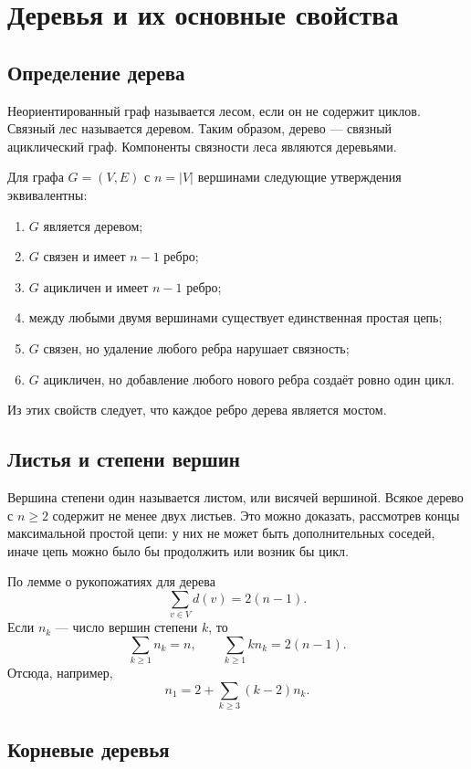 \section{Деревья и их основные свойства}
\label{sec:trees-properties}

\subsection{Определение дерева}

Неориентированный граф называется лесом, если он не содержит циклов. Связный
лес называется деревом. Таким образом, дерево --- связный ациклический граф.
Компоненты связности леса являются деревьями.

Для графа $G=(V,E)$ с $n=|V|$ вершинами следующие утверждения эквивалентны:
\begin{enumerate}
    \item $G$ является деревом;
    \item $G$ связен и имеет $n-1$ ребро;
    \item $G$ ацикличен и имеет $n-1$ ребро;
    \item между любыми двумя вершинами существует единственная простая цепь;
    \item $G$ связен, но удаление любого ребра нарушает связность;
    \item $G$ ацикличен, но добавление любого нового ребра создаёт ровно один цикл.
\end{enumerate}

Из этих свойств следует, что каждое ребро дерева является мостом.

\subsection{Листья и степени вершин}

Вершина степени один называется листом, или висячей вершиной. Всякое дерево с
$n\geq2$ содержит не менее двух листьев. Это можно доказать, рассмотрев концы
максимальной простой цепи: у них не может быть дополнительных соседей, иначе
цепь можно было бы продолжить или возник бы цикл.

По лемме о рукопожатиях для дерева
\[
    \sum_{v\in V}d(v)=2(n-1).
\]
Если $n_k$ --- число вершин степени $k$, то
\[
    \sum_{k\geq1}n_k=n,
    \qquad
    \sum_{k\geq1}k n_k=2(n-1).
\]
Отсюда, например,
\[
    n_1=2+\sum_{k\geq3}(k-2)n_k.
\]

\subsection{Корневые деревья}

